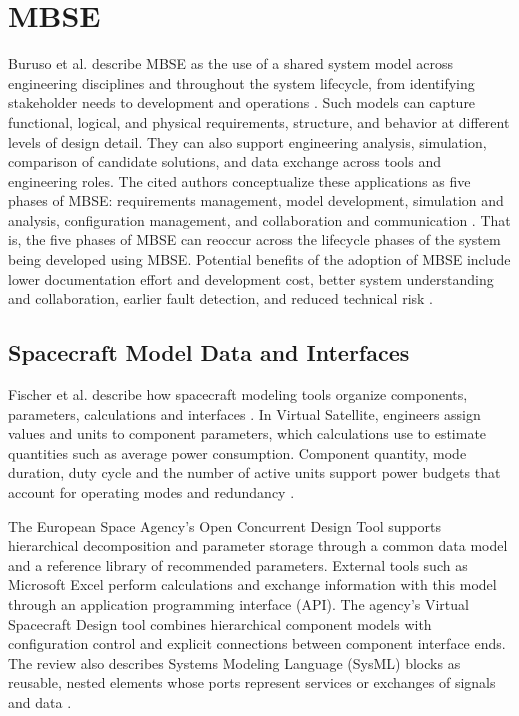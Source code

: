\section{MBSE}
Buruso et al. describe MBSE as the use of a shared system model across engineering disciplines and throughout the system lifecycle, from identifying stakeholder needs to development and operations \cite{buruso2026modelbased}.
Such models can capture functional, logical, and physical requirements, structure, and behavior at different levels of design detail.
They can also support engineering analysis, simulation, comparison of candidate solutions, and data exchange across tools and engineering roles.
The cited authors conceptualize these applications as five phases of MBSE: requirements management, model development, simulation and analysis, configuration management, and collaboration and communication
\cite{buruso2026modelbased}.
That is, the five phases of MBSE can reoccur across the lifecycle phases of the system being developed using MBSE.
Potential benefits of the adoption of MBSE include lower documentation effort and development cost, better system understanding and collaboration, earlier fault detection, and reduced technical risk \cite{buruso2026modelbased}.

\subsection{Spacecraft Model Data and Interfaces}
Fischer et al. describe how spacecraft modeling tools organize components, parameters, calculations and interfaces \citep{review-1277}.
In Virtual Satellite, engineers assign values and units to component parameters, which calculations use to estimate quantities such as average power consumption.
Component quantity, mode duration, duty cycle and the number of active units support power budgets that account for operating modes and redundancy \citep{review-1277}.

The European Space Agency's Open Concurrent Design Tool supports hierarchical decomposition and parameter storage through a common data model and a reference library of recommended parameters.
External tools such as Microsoft Excel perform calculations and exchange information with this model through an application programming interface (API).
The agency's Virtual Spacecraft Design tool combines hierarchical component models with configuration control and explicit connections between component interface ends.
The review also describes Systems Modeling Language (SysML) blocks as reusable, nested elements whose ports represent services or exchanges of signals and data \citep{review-1277}.

